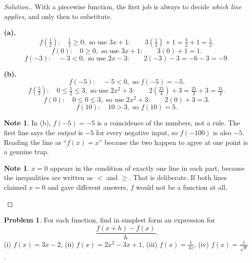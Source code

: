 \documentclass[11pt,a4paper]{article}
\theoremstyle{definition}
\newtheorem{note}[thm]{Note}
\newtheorem{problemx}{Problem}[section]
\newenvironment{problem}{\begin{problemx}}{\end{problemx}}
\newenvironment{solution}
  {\renewcommand{\qedsymbol}{}\begin{proof}[\textit{Solution}.]}
  {\end{proof}}
\begin{document}
\begin{solution}
With a piecewise function, the first job is always to decide \emph{which line applies},
and only then to substitute.

\textbf{(a).}
$$f\left(\tfrac{1}{2}\right):\quad \tfrac{1}{2}\geq 0,\text{ so use } 3x+1:\qquad
3\left(\tfrac{1}{2}\right)+1=\tfrac{3}{2}+1=\tfrac{5}{2}.$$
$$f(0):\quad 0\geq 0,\text{ so use } 3x+1:\qquad 3(0)+1=1.$$
$$f(-3):\quad -3<0,\text{ so use } 2x-3:\qquad 2(-3)-3=-6-3=-9.$$

\textbf{(b).}
$$f(-5):\quad -5<0,\text{ so } f(-5)=-5.$$
$$f\left(\tfrac{5}{2}\right):\quad 0\leq \tfrac{5}{2}\leq 3,\text{ so use } 2x^2+3:
\qquad 2\left(\tfrac{25}{4}\right)+3=\tfrac{25}{2}+3=\tfrac{31}{2}.$$
$$f(0):\quad 0\leq 0\leq 3,\text{ so use } 2x^2+3:\qquad 2(0)+3=3.$$
$$f(10):\quad 10>3,\text{ so } f(10)=5.$$

\begin{note}
In (b), $f(-5)=-5$ is a coincidence of the numbers, not a rule. The first line says the
\emph{output} is $-5$ for every negative input, so $f(-100)$ is also $-5$. Reading the
line as ``$f(x)=x$'' because the two happen to agree at one point is a genuine trap.
\end{note}

\begin{note}
$x=0$ appears in the condition of exactly one line in each part, because the
inequalities are written as $<$ and $\geq$. That is deliberate. If both lines claimed
$x=0$ and gave different answers, $f$ would not be a function at all.
\end{note}
\end{solution}

\begin{problem}
For each function, find in simplest form an expression for
$$\frac{f(x+h)-f(x)}{h}.$$
\quad (i) $f(x)=3x-2$, \quad (ii) $f(x)=2x^2-3x+1$, \quad (iii) $f(x)=\frac{1}{2x}$,
\quad (iv) $f(x)=\frac{1}{\sqrt{x}}$.
\end{problem}
\end{document}
